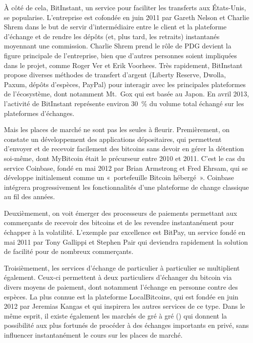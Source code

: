 À côté de cela, BitInstant, un service pour faciliter les transferts aux États-Unis, se popularise. L'entreprise est cofondée en juin 2011 par Gareth Nelson et Charlie Shrem dans le but de servir d'intermédiaire entre le client et la plateforme d'échange et de rendre les dépôts (et, plus tard, les retraits) instantanés moyennant une commission. Charlie Shrem prend le rôle de PDG devient la figure principale de l'entreprise, bien que d'autres personnes soient impliquées dans le projet, comme Roger Ver et Erik Voorhees. Très rapidement, BitInstant propose diverses méthodes de transfert d'argent (Liberty Reserve, Dwolla, Paxum, dépôts d'espèces, PayPal) pour interagir avec les principales plateformes de l'écosystème, dont notamment Mt.~Gox qui est basée au Japon. En avril 2013, l'activité de BitInstant représente environ 30~\% du volume total échangé sur les plateformes d'échanges.

Mais les places de marché ne sont pas les seules à fleurir. Premièrement, on constate un développement des applications dépositaires, qui permettent d'envoyer et de recevoir facilement des bitcoins sans devoir en gérer la détention soi-même, dont MyBitcoin était le précurseur entre 2010 et 2011. C'est le cas du service Coinbase, fondé en mai 2012 par Brian Armstrong et Fred Ehrsam, qui se développe initialement comme un «~portefeuille Bitcoin hébergé~». Coinbase intégrera progressivement les fonctionnalités d'une plateforme de change classique au fil des années.

Deuxièmement, on voit émerger des processeurs de paiements permettant aux commerçants de recevoir des bitcoins et de les revendre instantanément pour échapper à la volatilité. L'exemple par excellence est BitPay, un service fondé en mai 2011 par Tony Gallippi et Stephen Pair qui deviendra rapidement la solution de facilité pour de nombreux commerçants.

Troisièmement, les services d'échange de particulier à particulier se multiplient également. Ceux-ci permettent à deux particuliers d'échanger du bitcoin via divers moyens de paiement, dont notamment l'échange en personne contre des espèces. La plus connue est la plateforme LocalBitcoins, qui est fondée en juin 2012 par Jeremias Kangas et qui inspirera les autres services de ce type. Dans le même esprit, il existe également les marchés de gré à gré () qui donnent la possibilité aux plus fortunés de procéder à des échanges importants en privé, sans influencer instantanément le cours sur les places de marché.

